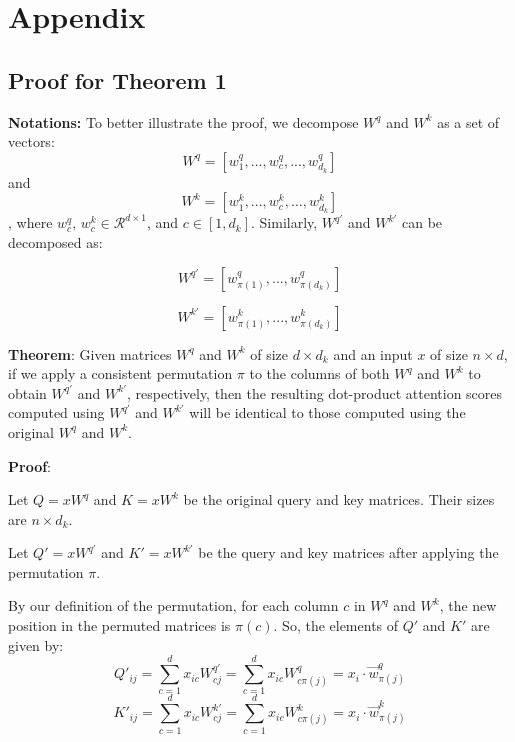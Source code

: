 \appendix
\section{Appendix}

\subsection{Proof for Theorem 1}
\label{sec:proof}


\textbf{Notations:} To better illustrate the proof, we decompose $W^q$ and $W^k$ as a set of vectors:
$$W^q = [w^q_1, ...,w^q_c,..., w^q_{d_k}]$$ and 
$$W^k = [w^k_1, ...,w^k_c,..., w^k_{d_k}]$$
, where $w^q_c \text{,  } w^k_c \in\mathcal{R}^{d\times1}$, and $c \in [1,d_k]$.
Similarly, $W^{q'}$ and $W^{k'}$  can be decomposed as:

\begin{equation}
W^{q'} = [w^q_{\pi(1)}, ..., w^q_{\pi(d_k)}] 
\label{eq:wq'}
\end{equation}


\begin{equation}
W^{k'} = [w^k_{\pi(1)}, ..., w^k_{\pi(d_k)}]
\label{eq:wk'}
\end{equation}





\textbf{Theorem}: Given matrices $W^q$ and $W^k$ of size $d \times d_k$ and an input $x$ of size $n \times d$, if we apply a consistent permutation $\pi$ to the columns of both $W^q$ and $W^k$ to obtain $W^{q'}$ and $W^{k'}$, respectively, then the resulting dot-product attention scores computed using $W^{q'}$ and $W^{k'}$ will be identical to those computed using the original $W^q$ and $W^k$.

\textbf{Proof}:

Let $Q = xW^q$ and $K = xW^k$ be the original query and key matrices. Their sizes are $n \times d_k$.

Let $Q' = xW^{q'}$ and $K' = xW^{k'}$ be the query and key matrices after applying the permutation $\pi$. 

By our definition of the permutation, for each column $c$ in $W^q$ and $W^k$, the new position in the permuted matrices is $\pi(c)$. So, the elements of $Q'$ and $K'$ are given by:
\begin{equation}
    Q'_{ij} = \sum_{c=1}^{d} x_{ic} W^{q'}_{cj} = \sum_{c=1}^{d} x_{ic} W^{q}_{c\pi(j)} = x_i \cdot \Vec{w}^q_{\pi(j)}
    \label{eq:Q'}
\end{equation}
\begin{equation}
    K'_{ij} =  \sum_{c=1}^{d} x_{ic} W^{k'}_{cj} = \sum_{c=1}^{d} x_{ic} W^{k}_{c\pi(j)} = x_i \cdot \Vec{w}^k_{\pi(j)}
    \label{eq:K'}
\end{equation}


